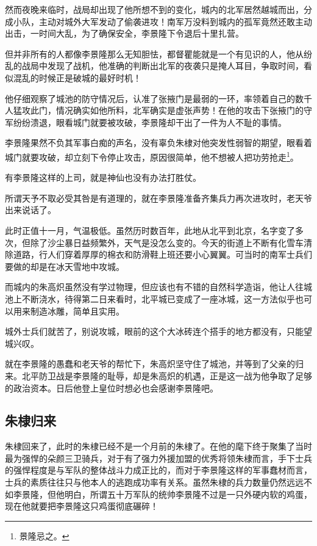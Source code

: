 \begin{multicols}{\theparacolNo}
		然而夜晚来临时，战局却出现了他所想不到的变化，城内的北军居然越城而出，分成小队，主动对城外大军发动了偷袭进攻！南军万没料到城内的孤军竟然还敢主动出击，一时间大乱，为了确保安全，李景隆下令退后十里扎营。

		但并非所有的人都像李景隆那么无知胆怯，都督瞿能就是一个有见识的人，他从纷乱的战局中发现了战机，他准确的判断出北军的夜袭只是掩人耳目，争取时间，看似混乱的时候正是破城的最好时机！

		他仔细观察了城池的防守情况后，认准了张掖门是最弱的一环，率领着自己的数千人猛攻此门，情况确实如他所料，北军确实是虚张声势！在他的攻击下张掖门的守军纷纷溃退，眼看城门就要被攻破，李景隆却干出了一件为人不耻的事情。

		李景隆果然不负其军事白痴的声名，没有辜负朱棣对他突发性弱智的期望，眼看着城门就要攻破，却立刻下令停止攻击，原因很简单，他不想被人把功劳抢走\footnote{景隆忌之。}。

		有李景隆这样的上司，就是神仙也没有办法打胜仗。

		所谓天予不取必受其咎是有道理的，就在李景隆准备齐集兵力再次进攻时，老天爷出来说话了。

		此时正值十一月，气温极低。虽然历时数百年，此地从北平到北京，名字变了多次，但除了沙尘暴日益频繁外，天气是没怎么变的。今天的街道上不断有化雪车清除道路，行人们穿着厚厚的棉衣和防滑鞋上班还要小心翼翼。可当时的南军士兵们要做的却是在冰天雪地中攻城。

		而城内的朱高炽虽然没有学过物理，但应该也有不错的自然科学造诣，他让人往城池上不断浇水，待得第二日来看时，北平城已变成了一座冰城，这一方法似乎也可以用来制造冰雕，简单且实用。

		城外士兵们就苦了，别说攻城，眼前的这个大冰砖连个搭手的地方都没有，只能望城兴叹。

		就在李景隆的愚蠢和老天爷的帮忙下，朱高炽坚守住了城池，并等到了父亲的归来。北平防卫战是李景隆的耻辱，却是朱高炽的机遇，正是这一战为他争取了足够的政治资本。日后他登上皇位时想必也会感谢李景隆吧。

		\subsection{朱棣归来}
		朱棣回来了，此时的朱棣已经不是一个月前的朱棣了。在他的麾下终于聚集了当时最为强悍的朵颜三卫骑兵，对于有了强力外援加盟的优秀将领朱棣而言，手下士兵的强悍程度是与军队的整体战斗力成正比的，而对于李景隆这样的军事蠢材而言，士兵的素质往往只与他本人的逃跑成功率有关系。虽然朱棣的兵力数量仍然远远不如李景隆，但他明白，所谓五十万军队的统帅李景隆不过是一只外硬内软的鸡蛋，现在他就要把李景隆这只鸡蛋彻底碾碎！


\end{multicols}
